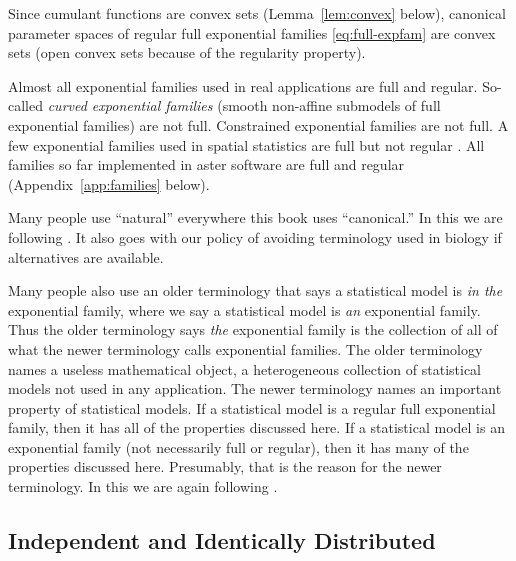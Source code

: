 Since cumulant functions are convex sets (Lemma~\ref{lem:convex} below),
canonical parameter spaces of regular full exponential families
\eqref{eq:full-expfam} are convex sets (open convex sets because of the
regularity property).

Almost all exponential families used in real applications are full and regular.
So-called \emph{curved exponential families} (smooth non-affine submodels of
full exponential families) are not full.
Constrained exponential families \citep{geyer-constrained} are not full.
A few exponential families used in spatial statistics are full but not regular
\citep{geyer-moller}.  All families so far implemented in aster software
are full and regular (Appendix~\ref{app:families} below).

Many people use ``natural'' everywhere this book uses ``canonical.''
In this we are following \citet{barndorff-nielsen}.
It also goes with our policy of avoiding terminology used in biology
if alternatives are available.

Many people also use an older terminology that says a statistical model
is \emph{in the} exponential family, where we say a statistical model
is \emph{an} exponential family.
Thus the older terminology says \emph{the} exponential
family is the collection of all of what the newer terminology calls
exponential families.  The older terminology names a useless
mathematical object, a heterogeneous collection of statistical models not
used in any application.
The newer terminology names an important property of statistical models.
If a statistical model is a regular full exponential family, then it
has all of the properties discussed here.
If a statistical model is an exponential family (not necessarily full or
regular), then it has many of the properties discussed here.
Presumably, that is the reason for the newer terminology.
In this we are again following \citet{barndorff-nielsen}.

\subsection{Independent and Identically Distributed}
\label{sec:iid}

